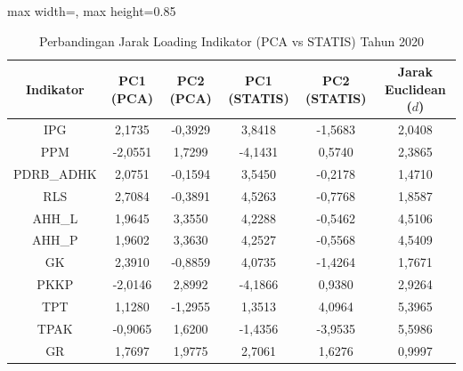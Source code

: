 \begin{table}[H]
\centering
\caption{Perbandingan Jarak Loading Indikator (PCA vs STATIS) Tahun 2020} \label{tab:app2jarak_loading_2020}
\begin{adjustbox}{max width=\textwidth, max height=0.85\textheight}
\begin{tabular}{|c|c|c|c|c|c|}
\hline
\textbf{Indikator} & \textbf{PC1 (PCA)} & \textbf{PC2 (PCA)} & \textbf{PC1 (STATIS)} & \textbf{PC2 (STATIS)} & \textbf{Jarak Euclidean ($d$)} \\
\hline
IPG & 2,1735 & -0,3929 & 3,8418 & -1,5683 & 2,0408 \\
PPM & -2,0551 & 1,7299 & -4,1431 & 0,5740 & 2,3865 \\
PDRB\_ADHK & 2,0751 & -0,1594 & 3,5450 & -0,2178 & 1,4710 \\
RLS & 2,7084 & -0,3891 & 4,5263 & -0,7768 & 1,8587 \\
AHH\_L & 1,9645 & 3,3550 & 4,2288 & -0,5462 & 4,5106 \\
AHH\_P & 1,9602 & 3,3630 & 4,2527 & -0,5568 & 4,5409 \\
GK & 2,3910 & -0,8859 & 4,0735 & -1,4264 & 1,7671 \\
PKKP & -2,0146 & 2,8992 & -4,1866 & 0,9380 & 2,9264 \\
TPT & 1,1280 & -1,2955 & 1,3513 & 4,0964 & 5,3965 \\
TPAK & -0,9065 & 1,6200 & -1,4356 & -3,9535 & 5,5986 \\
GR & 1,7697 & 1,9775 & 2,7061 & 1,6276 & 0,9997 \\
\hline
\end{tabular}
\end{adjustbox}
\end{table}